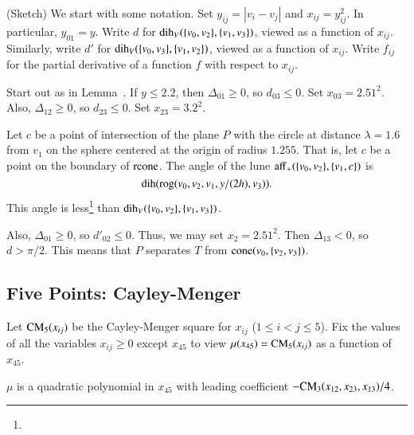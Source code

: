 \begin{tarskidata}
\begin{tarski}
\begin{proved} (Sketch)  We start with some notation.
Set $y_{ij}=|v_i-v_j|$ and $x_{ij} =y_{ij}^2$.  In particular, $y_{01}=y$.
Write $d$ for $\operatorname{dih}_V(\{v_0,v_2\},\{v_1,v_3\})$, viewed as a function
of $x_{ij}$.
Similarly, write $d'$ for $\operatorname{dih}_V(\{v_0,v_3\},\{v_1,v_2\})$, 
viewed as a function
of $x_{ij}$.
Write $f_{ij}$ for the
partial derivative of a function $f$ with respect to $x_{ij}$. 

Start out as in Lemma~.
If $y\le 2.2$, then $\Delta_{01}\ge0$, so
    $d_{03}\le 0$.
Set $x_{03}=2.51^2$. Also, $\Delta_{12}\ge0$, so
    $d_{23}\le0$.
Set $x_{23}=3.2^2$.

Let $c$ be a point of intersection of the plane $P$ with
the circle at distance $\lambda=1.6$ from $v_1$ on the sphere centered
at the origin of radius $1.255$.  That is, let $c$ be a point on the boundary
of ${\operatorname{rcone}}$.  The angle of the lune ${\operatorname{aff}}_+(\{v_0,v_2\},\{v_1,c\})$
is 
    $$\operatorname{dih}({\operatorname{rog}}(v_0,v_2,v_1,y/(2 h),v_3)).$$
This angle is less\footnote{} %
than $\operatorname{dih}_V(\{v_0,v_2\},\{v_1,v_3\})$. 

Also, $\Delta_{01}\ge0$, so $d'_{02}\le 0$.  Thus, we may
set $x_2=2.51^2$. Then
$\Delta_{13}<0$, so $d >\pi/2$.  This means that $P$
separates $T$ from ${\operatorname{cone}}(v_0,\{v_2,v_3\})$. 
\swallowed\end{proved}
\end{tarski}





\begin{tarski}
\section{Five Points: Cayley-Menger}
Let ${\operatorname{CM}}_5(x_{ij})$ be the Cayley-Menger
square for $x_{ij}$  ($1\le i < j\le 5$).  Fix the values of all the variables $x_{ij}\ge 0$ except
$x_{45}$ to view $\mu(x_{45})={\operatorname{CM}}_5(x_{ij})$ as a function of $x_{45}$.

\begin{lemma}
$\mu$  is a quadratic
polynomial in $x_{45}$ with leading coefficient 
$-{\operatorname{CM}}_3(x_{12},x_{23},x_{13})/4$. 
\end{lemma}


\end{tarski}
\end{tarskidata}
